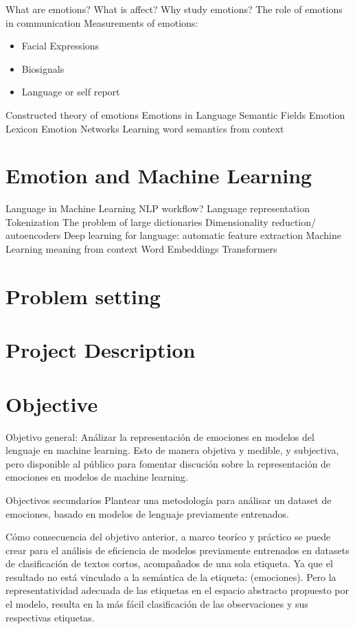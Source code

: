 What are emotions?
What is affect?
Why study emotions?
The role of emotions in communication
Measurements of emotions:
\begin{itemize}
  \item Facial Expressions
  \item Biosignals
  \item Language or self report
\end{itemize}

Constructed theory of emotions
Emotions in Language
Semantic Fields
Emotion Lexicon
Emotion Networks
Learning word semantics from context

\section{Emotion and Machine Learning}\label{sec:Emotion and Machine Learning}
Language in Machine Learning
NLP workflow?
Language representation
Tokenization
The problem of large dictionaries
Dimensionality reduction/ autoencoders
Deep learning for language: automatic feature extraction
Machine Learning meaning from context
Word Embeddings
Transformers

\section{Problem setting}\label{sec:Problem setting}


\section{Project Description}\label{sec:Project Description}


\section{Objective}\label{sec:Objective}

Objetivo general:
Análizar la representación de emociones en modelos del lenguaje en machine learning. Esto de manera objetiva y medible, y subjectiva, pero disponible al público para fomentar discución sobre la representación de emociones en modelos de machine learning.

Objectivos secundarios
Plantear una metodología para análisar un dataset de emociones, basado en modelos de lenguaje previamente entrenados.

Cómo consecuencia del objetivo anterior, a marco teoríco y práctico se puede crear para el análisis de eficiencia de modelos previamente entrenados en datasets de clasificación de textos cortos, acompañados de una sola etiqueta. Ya que el resultado no está vinculado a la semántica de la etiqueta: (emociones). Pero la representatividad adecuada de las etiquetas en el espacio abstracto propuesto por el modelo, resulta en la más fácil clasificación de las observaciones y sus respectivas etiquetas.

